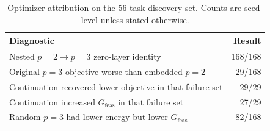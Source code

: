 
\begin{table}[t]
\centering
\caption{Optimizer attribution on the 56-task discovery set. Counts are seed-level unless stated otherwise.}
\label{tab:optimizer-attribution}
\small
\begin{tabularx}{\textwidth}{@{}Xr@{}}
\toprule
Diagnostic & Result \\
\midrule
Nested $p=2\to p=3$ zero-layer identity & 168/168 \\
Original $p=3$ objective worse than embedded $p=2$ & 29/168 \\
Continuation recovered lower objective in that failure set & 29/29 \\
Continuation increased $G_{\mathrm{feas}}$ in that failure set & 27/29 \\
Random $p=3$ had lower energy but lower $G_{\mathrm{feas}}$ & 82/168 \\
\bottomrule
\end{tabularx}
\end{table}
